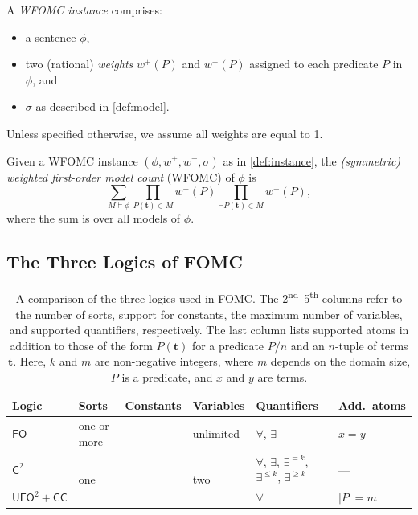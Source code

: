 \documentclass[a4paper,UKenglish,cleveref,autoref]{lipics-v2021}
\newcommand{\cmark}{\ding{51}}
\newcommand{\xmark}{\ding{55}}
\newcommand{\Ctwo}{$\mathsf{C}^{2}$}
\newcommand{\FO}{$\mathsf{FO}$}
\newcommand{\UFO}{$\mathsf{UFO}^{2} + \mathsf{CC}$}
\begin{document}
\begin{definition}\label{def:instance}
  A \emph{WFOMC instance} comprises:
  \begin{itemize}
    \item a sentence $\phi$,
    \item two (rational) \emph{weights} $w^{+}(P)$ and $w^{-}(P)$ assigned to
          each predicate $P$ in $\phi$, and
    \item $\sigma$ as described in \cref{def:model}.
  \end{itemize}
  Unless specified otherwise, we assume all weights are equal to 1.
\end{definition}

\begin{definition}
  Given a WFOMC instance $(\phi, w^{+}, w^{-}, \sigma)$ as in
  \cref{def:instance}, the \emph{(symmetric) weighted first-order model count}
  (WFOMC) of $\phi$ is
  \begin{equation}\label{eq:wfomc}
    \sum_{M \models \phi} \prod_{P(\mathbf{t}) \in M} w^{+}(P) \prod_{\neg P(\mathbf{t}) \in M} w^{-}(P),
  \end{equation}
  where the sum is over all models of $\phi$.
\end{definition}

\subsection{The Three Logics of FOMC}\label{sec:threelogics}

\begin{table}[t]
  \centering
  \caption{A comparison of the three logics used in FOMC\@. The
    2\textsuperscript{nd}--5\textsuperscript{th} columns refer to the number of
    sorts, support for constants, the maximum number of variables, and supported
    quantifiers, respectively. The last column lists supported atoms in addition
    to those of the form $P(\mathbf{t})$ for a predicate $P/n$ and an $n$-tuple
    of terms $\mathbf{t}$. Here, $k$ and $m$ are non-negative integers, where
    $m$ depends on the domain size, $P$ is a predicate, and $x$ and $y$ are
    terms.}\label{tbl:logics}
  \begin{tabular}{llclll}
    \toprule
    Logic & Sorts & Constants & Variables & Quantifiers & Add.\ atoms\\
    \midrule
    \rowcolor{gray!10}
    \FO & one or more & \cmark & unlimited & $\forall$, $\exists$ & $x = y$\\
    \Ctwo & \multirow{2}{*}{one} & \multirow{2}{*}{\xmark} & \multirow{2}{*}{two} & $\forall$, $\exists$, $\exists^{= k}$, $\exists^{\le k}$, $\exists^{\ge k}$ & ---\\
    \UFO & & & & $\forall$ & $|P| = m$\\
    \bottomrule
  \end{tabular}
\end{table}
\end{document}
